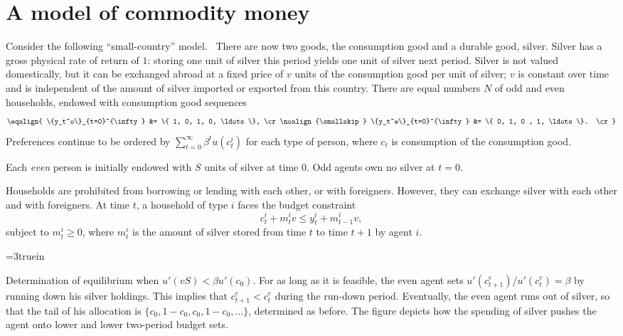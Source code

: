\section{A model of commodity money}
Consider the following ``small-country'' model.
\
 There are now two goods, the consumption good and a durable good, silver.
Silver has a gross physical rate of return of $1$: storing one unit of silver
this period yields one unit of silver next period.  Silver is not valued
domestically, but it can be exchanged abroad at a fixed price of $v$ units of
the consumption good per unit of silver; $v$ is constant over time and is
independent of the amount of silver imported or exported from this country.
There are equal numbers $N$ of odd and even households, endowed
with consumption good sequences
$$\eqalign{ \{y_t^o\}_{t=0}^{\infty} &= \{ 1, 0, 1, 0, \ldots \}, \cr
\noalign{\smallskip}
            \{y_t^e\}_{t=0}^{\infty} &= \{ 0, 1, 0 , 1, \ldots \}. \cr }  $$
Preferences continue to be  ordered by $\sum_{t=0}^\infty \beta^t
u(c_t^i)$ for each type of person, where $c_t$ is consumption
of the consumption good.

   Each {\it even\/} person is initially endowed with $S$ units of
silver at time $0$. Odd agents own no silver at $t=0$.

 Households are prohibited from borrowing or lending with each other, or with
foreigners.  However, they can exchange silver with each other and with
foreigners.  At time $t$, a household of type $i$ faces the budget constraint
$$ c_t^i + m_t^i v \leq y_t^i + m_{t-1}^i v, $$
subject to $m_t^i \geq 0$, where $m_t^i$ is the amount of
silver stored from time $t$ to time $t+1$ by agent $i$.


\centerline{\epsfxsize=3truein}
\caption{Determination of equilibrium when $u'(v S) < \beta u'(c_0)$.  For
as long as it is feasible, the even agent sets $u'(c_{t+1}^e) /u'(c_t^e) = \beta$
by running down his silver holdings.  This implies that  $c_{t+1}^e < c_t^e$
during the run-down period.  Eventually, the even agent runs out of silver,
so that the tail of his allocation is $\{c_0, 1-c_0, c_0, 1-c_0, \ldots\}$,
determined as before.  The figure depicts how the spending of silver pushes the
agent onto lower and lower two-period budget sets.}
\endfigure

